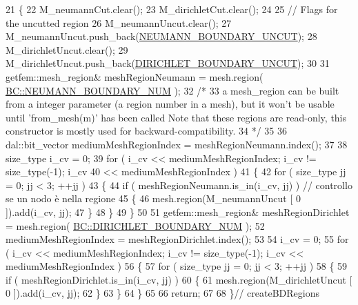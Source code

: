 \begin{DoxyCode}
21 \{
22     M\_neumannCut.clear();
23     M\_dirichletCut.clear();
24 
25     \textcolor{comment}{// Flags for the uncutted region}
26     M\_neumannUncut.clear();
27     M\_neumannUncut.push\_back(\hyperlink{classBCHandler_a2bc86209db0836dbc6ca56e1ca4e4ac1aa538eee48606669ac37073ca65144007}{NEUMANN\_BOUNDARY\_UNCUT});
28     M\_dirichletUncut.clear();
29     M\_dirichletUncut.push\_back(\hyperlink{classBCHandler_a2bc86209db0836dbc6ca56e1ca4e4ac1a487ba8af2086045d8b0df840b2525866}{DIRICHLET\_BOUNDARY\_UNCUT});
30 
31     getfem::mesh\_region& meshRegionNeumann = mesh.region( 
      \hyperlink{classBC_ad1b507696802f73b95c0ca59f4c41390a432aa77a00d8eb4929463ef8d57b5c04}{BC::NEUMANN\_BOUNDARY\_NUM} );
32 \textcolor{comment}{/*}
33 \textcolor{comment}{a mesh\_region can be built from a integer parameter (a region number in a mesh), but it won't be usable
       until 'from\_mesh(m)' has been called Note that these regions are read-only, this constructor is mostly used for
       backward-compatibility.}
34 \textcolor{comment}{*/}
35 
36     dal::bit\_vector mediumMeshRegionIndex = meshRegionNeumann.index();
37 
38     size\_type i\_cv = 0;
39     \textcolor{keywordflow}{for} ( i\_cv << mediumMeshRegionIndex; i\_cv != size\_type(-1); i\_cv
40             << mediumMeshRegionIndex )
41     \{
42         \textcolor{keywordflow}{for} ( size\_type jj = 0; jj < 3; ++jj )
43         \{
44             \textcolor{keywordflow}{if} ( meshRegionNeumann.is\_in(i\_cv, jj) ) \textcolor{comment}{// controllo se un nodo è nella regione}
45             \{
46                 mesh.region(M\_neumannUncut [ 0 ]).add(i\_cv, jj);
47             \}
48         \}
49     \}
50 
51     getfem::mesh\_region& meshRegionDirichlet = mesh.region( 
      \hyperlink{classBC_ad1b507696802f73b95c0ca59f4c41390a99103ccd54ba29b1bd2670cc6cd0c462}{BC::DIRICHLET\_BOUNDARY\_NUM} );
52     mediumMeshRegionIndex = meshRegionDirichlet.index();
53 
54     i\_cv = 0;
55     \textcolor{keywordflow}{for} ( i\_cv << mediumMeshRegionIndex; i\_cv != size\_type(-1); i\_cv << mediumMeshRegionIndex )
56     \{
57         \textcolor{keywordflow}{for} ( size\_type jj = 0; jj < 3; ++jj )
58         \{
59             \textcolor{keywordflow}{if} ( meshRegionDirichlet.is\_in(i\_cv, jj) )
60             \{
61                 mesh.region(M\_dirichletUncut [ 0 ]).add(i\_cv, jj);
62             \}
63         \}
64     \}
65     
66     \textcolor{keywordflow}{return};
67     
68 \}\textcolor{comment}{// createBDRegions}
\end{DoxyCode}
